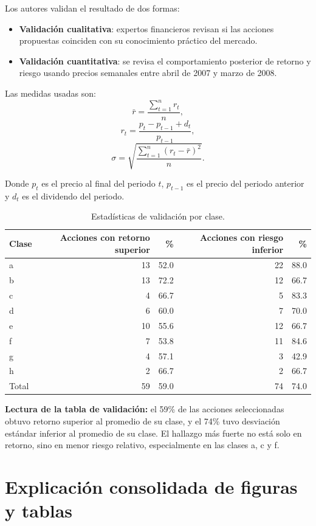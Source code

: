 \documentclass[11pt,a4paper]{article}
\begin{document}
Los autores validan el resultado de dos formas:

\begin{itemize}[leftmargin=*]
    \item \textbf{Validación cualitativa}: expertos financieros revisan si las acciones propuestas coinciden con su conocimiento práctico del mercado.
    \item \textbf{Validación cuantitativa}: se revisa el comportamiento posterior de retorno y riesgo usando precios semanales entre abril de 2007 y marzo de 2008.
\end{itemize}

Las medidas usadas son:
\[
\bar{r}=\frac{\sum_{t=1}^{n} r_t}{n},
\]
\[
r_t=\frac{p_t-p_{t-1}+d_t}{p_{t-1}},
\]
\[
\sigma=\sqrt{\frac{\sum_{t=1}^{n}(r_t-\bar{r})^2}{n}}.
\]

Donde $p_t$ es el precio al final del periodo $t$, $p_{t-1}$ es el precio del periodo anterior y $d_t$ es el dividendo del periodo.

\begin{table}[h!]
\centering
\caption{Estadísticas de validación por clase.}
\label{tab:validacion}
\begin{tabular}{lrrrr}
\toprule
Clase & Acciones con retorno superior & \% & Acciones con riesgo inferior & \% \\
\midrule
a & 13 & 52.0 & 22 & 88.0 \\
b & 13 & 72.2 & 12 & 66.7 \\
c & 4 & 66.7 & 5 & 83.3 \\
d & 6 & 60.0 & 7 & 70.0 \\
e & 10 & 55.6 & 12 & 66.7 \\
f & 7 & 53.8 & 11 & 84.6 \\
g & 4 & 57.1 & 3 & 42.9 \\
h & 2 & 66.7 & 2 & 66.7 \\
\midrule
Total & 59 & 59.0 & 74 & 74.0 \\
\bottomrule
\end{tabular}
\end{table}

\textbf{Lectura de la tabla de validación:} el 59\% de las acciones seleccionadas obtuvo retorno superior al promedio de su clase, y el 74\% tuvo desviación estándar inferior al promedio de su clase. El hallazgo más fuerte no está solo en retorno, sino en menor riesgo relativo, especialmente en las clases a, c y f.

\section{Explicación consolidada de figuras y tablas}
\end{document}
